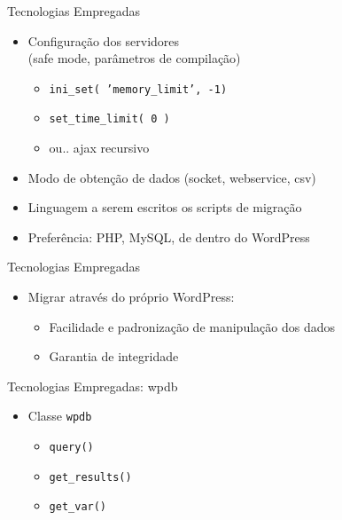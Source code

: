 \documentclass[handout]{beamer}
\begin{document}
\begin{frame}{Tecnologias Empregadas}
  \begin{itemize}
    \pause \item Configuração dos servidores\pause \\
                 (safe mode, parâmetros de compilação)
    \begin{itemize}
      \pause \item \texttt{ini\_set( 'memory\_limit', -1)}
      \pause \item \texttt{set\_time\_limit( 0 )}
      \pause \item ou.. \pause ajax recursivo
    \end{itemize}
    \pause \item Modo de obtenção de dados (socket, webservice, csv)
    \pause \item Linguagem a serem escritos os scripts de migração
    \pause \item Preferência: \pause PHP\pause, MySQL\pause, de dentro
                 do WordPress
  \end{itemize}
\end{frame}

\begin{frame}{Tecnologias Empregadas}
  \begin{itemize}
    \pause \item Migrar através do próprio WordPress:
    \begin{itemize}
      \pause \item Facilidade e padronização de manipulação dos dados
      \pause \item Garantia de integridade
    \end{itemize}
  \end{itemize}
\end{frame}

\begin{frame}{Tecnologias Empregadas: wpdb}
  \begin{itemize}
    \pause \item Classe \texttt{wpdb}
    \begin{itemize}
      \pause \item \texttt{query()}
      \pause \item \texttt{get\_results()}
      \pause \item \texttt{get\_var()}
    \end{itemize}
  \end{itemize}
\end{frame}
\end{document}
